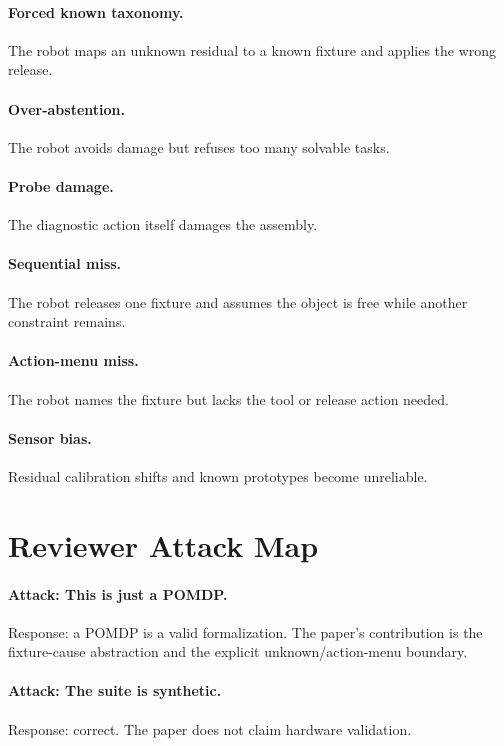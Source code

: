 \documentclass{article}
\begin{document}
\paragraph{Forced known taxonomy.}
The robot maps an unknown residual to a known fixture and applies the wrong
release.

\paragraph{Over-abstention.}
The robot avoids damage but refuses too many solvable tasks.

\paragraph{Probe damage.}
The diagnostic action itself damages the assembly.

\paragraph{Sequential miss.}
The robot releases one fixture and assumes the object is free while another
constraint remains.

\paragraph{Action-menu miss.}
The robot names the fixture but lacks the tool or release action needed.

\paragraph{Sensor bias.}
Residual calibration shifts and known prototypes become unreliable.

\section{Reviewer Attack Map}

\paragraph{Attack: This is just a POMDP.}
Response: a POMDP is a valid formalization. The paper's contribution is the
fixture-cause abstraction and the explicit unknown/action-menu boundary.

\paragraph{Attack: The suite is synthetic.}
Response: correct. The paper does not claim hardware validation.
\end{document}
